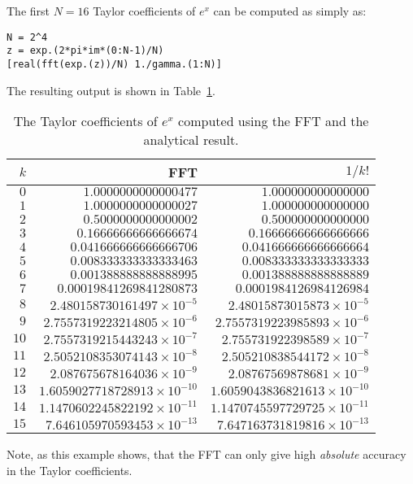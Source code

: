 \begin{example}
The first $N=16$ Taylor coefficients of $e^x$ can be computed as simply as:
\begin{verbatim}
N = 2^4
z = exp.(2*pi*im*(0:N-1)/N)
[real(fft(exp.(z))/N) 1./gamma.(1:N)]
\end{verbatim}
The resulting output is shown in Table~\ref{table:TaylorExponential}.
\begin{table}[htdp]
\caption{The Taylor coefficients of $e^x$ computed using the FFT and the analytical result.}
\begin{center}
\begin{tabular}{rrr}
\hline
$k$ & FFT & $1/k!$\\
\hline
$0$ & $1.0000000000000477$ & $1.000000000000000$\\
$1$ & $1.0000000000000027$ & $1.000000000000000$\\
$2$ & $0.5000000000000002$ & $0.500000000000000$\\
$3$ & $0.16666666666666674$ & $0.16666666666666666$\\
$4$ & $0.041666666666666706$ & $0.041666666666666664$\\
$5$ & $0.008333333333333463$ & $0.008333333333333333$\\
$6$ & $0.001388888888888995$ & $0.001388888888888889$\\
$7$ & $0.00019841269841280873$ & $0.0001984126984126984$\\
$8$ & $2.480158730161497\times10^{-5}$ & $2.48015873015873\times10^{-5}$\\
$9$ & $2.7557319223214805\times10^{-6}$ & $2.7557319223985893\times10^{-6}$\\
$10$ & $2.7557319215443243\times10^{-7}$ & $2.755731922398589\times10^{-7}$\\
$11$ & $2.5052108353074143\times10^{-8}$ & $2.505210838544172\times10^{-8}$\\
$12$ & $2.087675678164036\times10^{-9}$ & $2.08767569878681\times10^{-9}$\\
$13$ & $1.6059027718728913\times10^{-10}$ & $1.6059043836821613\times10^{-10}$\\
$14$ & $1.1470602245822192\times10^{-11}$ & $1.1470745597729725\times10^{-11}$\\
$15$ & $7.646105970593453\times10^{-13}$ & $7.647163731819816\times10^{-13}$\\
\hline
\end{tabular}
\end{center}
\label{table:TaylorExponential}
\end{table}%
Note, as this example shows, that the FFT can only give high {\em absolute} accuracy in the Taylor coefficients.
\end{example}

